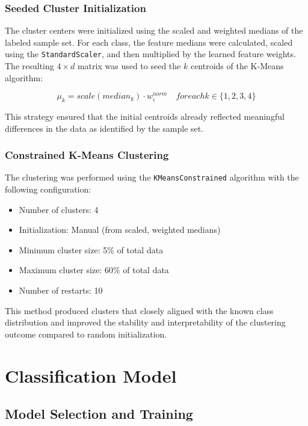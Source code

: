 \documentclass[a4paper,12pt,twoside]{scrreprt}
\begin{document}
\subsubsection{Seeded Cluster Initialization}

The cluster centers were initialized using the scaled and weighted medians of
the labeled sample set. For each class, the feature medians were calculated,
scaled using the \texttt{StandardScaler}, and then multiplied by the learned
feature weights. The resulting $4 \times d$ matrix was used to seed the $k$
centroids of the K-Means algorithm:

\[
  \mu_k = scale(median_k) \cdot w_i^{norm}
  \quad for each k \in \{1, 2, 3, 4\}
\]

This strategy ensured that the initial centroids already reflected meaningful
differences in the data as identified by the sample set.

\subsubsection{Constrained K-Means Clustering}

The clustering was performed using the \texttt{KMeansConstrained} algorithm
with the following configuration:

\begin{itemize}
  \item Number of clusters: 4
  \item Initialization: Manual (from scaled, weighted medians)
  \item Minimum cluster size: 5\% of total data
  \item Maximum cluster size: 60\% of total data
  \item Number of restarts: 10
\end{itemize}

This method produced clusters that closely aligned with the known class
distribution and improved the stability and interpretability of the clustering
outcome compared to random initialization.

\section{Classification Model}

\subsection{Model Selection and Training}
\end{document}
